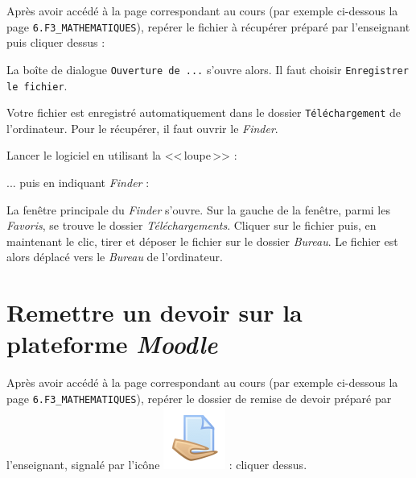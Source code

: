 Après avoir accédé à la page correspondant au cours (par exemple ci-dessous la page \texttt{6.F3\_MATHEMATIQUES}), repérer le fichier à récupérer préparé par l'enseignant puis cliquer dessus :


La boîte de dialogue \texttt{Ouverture de ...} s'ouvre alors. Il faut choisir \texttt{Enregistrer le fichier}.


Votre fichier est enregistré automatiquement dans le dossier \texttt{Téléchargement} de l'ordinateur. Pour le récupérer, il faut ouvrir le \emph{Finder}.

Lancer le logiciel en utilisant la <<\,loupe\,>> :


... puis en indiquant \emph{Finder} :


La fenêtre principale du \emph{Finder} s'ouvre. Sur la gauche de la fenêtre, parmi les \emph{Favoris}, se trouve le dossier \emph{Téléchargements}. Cliquer sur le fichier puis, en maintenant le clic, tirer et déposer le fichier sur le dossier \emph{Bureau}. Le fichier est alors déplacé vers le \emph{Bureau} de l'ordinateur.  


 





\section{Remettre un devoir sur la plateforme \emph{Moodle}}\label{MoodleRendreDevoir}

Après avoir accédé à la page correspondant au cours (par exemple ci-dessous la page \texttt{6.F3\_MATHEMATIQUES}), repérer le dossier de remise de devoir préparé par l'enseignant, signalé par l'icône \includegraphics[width=.04\textwidth]{./images/methode/MoodleDevoirIcone1} : cliquer dessus.


